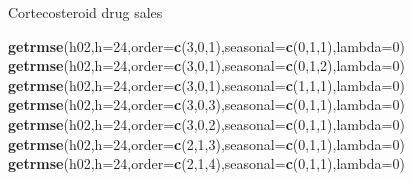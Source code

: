 \documentclass[14pt,ignorenonframetext,]{beamer}
\newenvironment{Shaded}{\begin{snugshade}}{\end{snugshade}}
\newcommand{\KeywordTok}[1]{\textcolor[rgb]{0.13,0.29,0.53}{\textbf{#1}}}
\newcommand{\DataTypeTok}[1]{\textcolor[rgb]{0.13,0.29,0.53}{#1}}
\newcommand{\DecValTok}[1]{\textcolor[rgb]{0.00,0.00,0.81}{#1}}
\newcommand{\NormalTok}[1]{#1}
\begin{document}
\begin{frame}[fragile]{Cortecosteroid drug sales}
\begin{Shaded}
\begin{Highlighting}[]
\KeywordTok{getrmse}\NormalTok{(h02,}\DataTypeTok{h=}\DecValTok{24}\NormalTok{,}\DataTypeTok{order=}\KeywordTok{c}\NormalTok{(}\DecValTok{3}\NormalTok{,}\DecValTok{0}\NormalTok{,}\DecValTok{1}\NormalTok{),}\DataTypeTok{seasonal=}\KeywordTok{c}\NormalTok{(}\DecValTok{0}\NormalTok{,}\DecValTok{1}\NormalTok{,}\DecValTok{1}\NormalTok{),}\DataTypeTok{lambda=}\DecValTok{0}\NormalTok{)}
\KeywordTok{getrmse}\NormalTok{(h02,}\DataTypeTok{h=}\DecValTok{24}\NormalTok{,}\DataTypeTok{order=}\KeywordTok{c}\NormalTok{(}\DecValTok{3}\NormalTok{,}\DecValTok{0}\NormalTok{,}\DecValTok{1}\NormalTok{),}\DataTypeTok{seasonal=}\KeywordTok{c}\NormalTok{(}\DecValTok{0}\NormalTok{,}\DecValTok{1}\NormalTok{,}\DecValTok{2}\NormalTok{),}\DataTypeTok{lambda=}\DecValTok{0}\NormalTok{)}
\KeywordTok{getrmse}\NormalTok{(h02,}\DataTypeTok{h=}\DecValTok{24}\NormalTok{,}\DataTypeTok{order=}\KeywordTok{c}\NormalTok{(}\DecValTok{3}\NormalTok{,}\DecValTok{0}\NormalTok{,}\DecValTok{1}\NormalTok{),}\DataTypeTok{seasonal=}\KeywordTok{c}\NormalTok{(}\DecValTok{1}\NormalTok{,}\DecValTok{1}\NormalTok{,}\DecValTok{1}\NormalTok{),}\DataTypeTok{lambda=}\DecValTok{0}\NormalTok{)}
\KeywordTok{getrmse}\NormalTok{(h02,}\DataTypeTok{h=}\DecValTok{24}\NormalTok{,}\DataTypeTok{order=}\KeywordTok{c}\NormalTok{(}\DecValTok{3}\NormalTok{,}\DecValTok{0}\NormalTok{,}\DecValTok{3}\NormalTok{),}\DataTypeTok{seasonal=}\KeywordTok{c}\NormalTok{(}\DecValTok{0}\NormalTok{,}\DecValTok{1}\NormalTok{,}\DecValTok{1}\NormalTok{),}\DataTypeTok{lambda=}\DecValTok{0}\NormalTok{)}
\KeywordTok{getrmse}\NormalTok{(h02,}\DataTypeTok{h=}\DecValTok{24}\NormalTok{,}\DataTypeTok{order=}\KeywordTok{c}\NormalTok{(}\DecValTok{3}\NormalTok{,}\DecValTok{0}\NormalTok{,}\DecValTok{2}\NormalTok{),}\DataTypeTok{seasonal=}\KeywordTok{c}\NormalTok{(}\DecValTok{0}\NormalTok{,}\DecValTok{1}\NormalTok{,}\DecValTok{1}\NormalTok{),}\DataTypeTok{lambda=}\DecValTok{0}\NormalTok{)}
\KeywordTok{getrmse}\NormalTok{(h02,}\DataTypeTok{h=}\DecValTok{24}\NormalTok{,}\DataTypeTok{order=}\KeywordTok{c}\NormalTok{(}\DecValTok{2}\NormalTok{,}\DecValTok{1}\NormalTok{,}\DecValTok{3}\NormalTok{),}\DataTypeTok{seasonal=}\KeywordTok{c}\NormalTok{(}\DecValTok{0}\NormalTok{,}\DecValTok{1}\NormalTok{,}\DecValTok{1}\NormalTok{),}\DataTypeTok{lambda=}\DecValTok{0}\NormalTok{)}
\KeywordTok{getrmse}\NormalTok{(h02,}\DataTypeTok{h=}\DecValTok{24}\NormalTok{,}\DataTypeTok{order=}\KeywordTok{c}\NormalTok{(}\DecValTok{2}\NormalTok{,}\DecValTok{1}\NormalTok{,}\DecValTok{4}\NormalTok{),}\DataTypeTok{seasonal=}\KeywordTok{c}\NormalTok{(}\DecValTok{0}\NormalTok{,}\DecValTok{1}\NormalTok{,}\DecValTok{1}\NormalTok{),}\DataTypeTok{lambda=}\DecValTok{0}\NormalTok{)}

\end{Highlighting}
\end{Shaded}
\end{frame}
\end{document}
